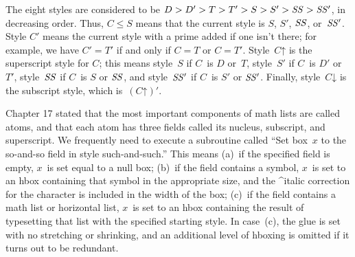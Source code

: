 The eight styles are considered to be $D>D'>T>T'>S>S'>\it SS>SS'$, in
decreasing order. Thus, $C\le S$ means that the current style is $S$,
$S'$, $\it SS$, or~$\it SS'$.  Style $C'$ means the current style with a
prime added if one isn't there; for example, we have $C'=T'$ if and only
if $C=T$ or $C=T'$.  Style~$C\mathord\uparrow$ is the superscript style
for $C$; this means style~$S$ if $C$~is $D$ or~$T$, style~$S'$ if $C$~is
$D'$ or $T'$, style~$\it SS$ if $C$~is $S$ or $\it SS$, and style~$\it
SS'$ if $C$~is $S'$ or $\it SS'$.  Finally, style~$C\mathord\downarrow$ is
the subscript style, which is~$(C\mathord\uparrow)'$.

Chapter 17 stated that the most important components of math lists are
called atoms, and that each atom has three fields called its nucleus,
subscript, and superscript.  We frequently need to execute a subroutine
called ``Set box~$x$ to the so-and-so field in style such-and-such.'' This
means (a)~if the specified field is empty, $x$~is set equal to a null box;
(b)~if the field contains a symbol, $x$~is set to an hbox containing that
symbol in the appropriate size, and the ^{italic correction} for the
character is included in the width of the box; (c)~if the field contains a
math list or horizontal list, $x$~is set to an hbox containing the result
of typesetting that list with the specified starting style. In case~(c),
the glue is set with no stretching or shrinking, and an additional level
of hboxing is omitted if it turns out to be redundant.

